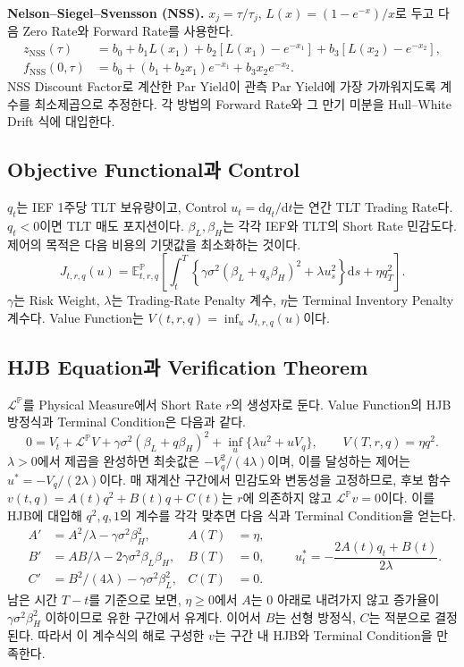 \documentclass[11pt,a4paper]{article}
\newcommand{\dif}{\mathrm d}
\begin{document}
\textbf{Nelson--Siegel--Svensson (NSS).} $x_j=\tau/\tau_j$,
$L(x)=(1-e^{-x})/x$로 두고 다음 Zero Rate와 Forward Rate를 사용한다.
\[
\begin{aligned}
 z_{\mathrm{NSS}}(\tau)&=b_0+b_1L(x_1)+b_2[L(x_1)-e^{-x_1}]
                                      +b_3[L(x_2)-e^{-x_2}],\\
 f_{\mathrm{NSS}}(0,\tau)&=b_0+(b_1+b_2x_1)e^{-x_1}+b_3x_2e^{-x_2}.
\end{aligned}
\]
NSS Discount Factor로 계산한 Par Yield이 관측 Par Yield에 가장 가까워지도록 계수를 최소제곱으로 추정한다. 각 방법의 Forward Rate와 그 만기 미분을 Hull--White Drift 식에 대입한다.

\subsection{Objective Functional과 Control}

$q_t$는 IEF 1주당 TLT 보유량이고, Control $u_t=\dif q_t/\dif t$는 연간 TLT Trading Rate다. $q_t<0$이면 TLT 매도 포지션이다. $\beta_L,\beta_H$는 각각 IEF와 TLT의 Short Rate 민감도다. 제어의 목적은 다음 비용의 기댓값을 최소화하는 것이다.
\[
 J_{t,r,q}(u)=\mathbb E^{\mathbb P}_{t,r,q}\left[
   \int_t^T\left\{\gamma\sigma^2(\beta_L+q_s\beta_H)^2
                        +\lambda u_s^2\right\}\dif s+\eta q_T^2
 \right].
\]
$\gamma$는 Risk Weight, $\lambda$는 Trading-Rate Penalty 계수, $\eta$는 Terminal Inventory Penalty 계수다. Value Function는 $V(t,r,q)=\inf_u J_{t,r,q}(u)$이다.

\subsection{HJB Equation과 Verification Theorem}

$\mathcal L^{\mathbb P}$를 Physical Measure에서 Short Rate $r$의 생성자로 둔다. Value Function의 HJB 방정식과 Terminal Condition은 다음과 같다.
\[
 0=V_t+\mathcal L^{\mathbb P}V+\gamma\sigma^2(\beta_L+q\beta_H)^2
       +\inf_u\{\lambda u^2+uV_q\},
 \qquad V(T,r,q)=\eta q^2.
\]
$\lambda>0$에서 제곱을 완성하면 최솟값은 $-V_q^2/(4\lambda)$이며, 이를 달성하는 제어는 $u^*=-V_q/(2\lambda)$이다.
매 재계산 구간에서 민감도와 변동성을 고정하므로, 후보 함수 $v(t,q)=A(t)q^2+B(t)q+C(t)$는 $r$에 의존하지 않고 $\mathcal L^{\mathbb P}v=0$이다. 이를 HJB에 대입해 $q^2,q,1$의 계수를 각각 맞추면 다음 식과 Terminal Condition을 얻는다.
\[
\begin{aligned}
 A'&=A^2/\lambda-\gamma\sigma^2\beta_H^2, & A(T)&=\eta,\\
 B'&=AB/\lambda-2\gamma\sigma^2\beta_L\beta_H, & B(T)&=0,\\
 C'&=B^2/(4\lambda)-\gamma\sigma^2\beta_L^2, & C(T)&=0 .
\end{aligned}
\qquad
 u_t^*=-\frac{2A(t)q_t+B(t)}{2\lambda}.
\]
남은 시간 $T-t$를 기준으로 보면, $\eta\ge0$에서 $A$는 0 아래로 내려가지 않고 증가율이 $\gamma\sigma^2\beta_H^2$ 이하이므로 유한 구간에서 유계다. 이어서 $B$는 선형 방정식, $C$는 적분으로 결정된다. 따라서 이 계수식의 해로 구성한 $v$는 구간 내 HJB와 Terminal Condition을 만족한다.
\end{document}
